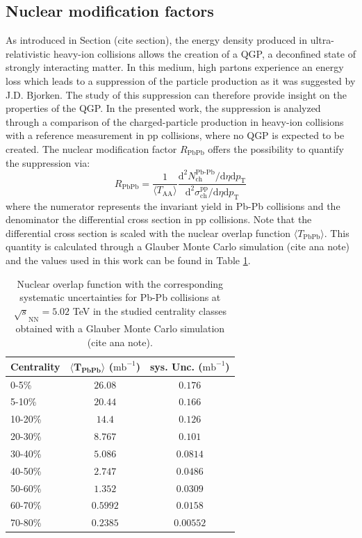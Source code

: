\documentclass[12pt,a4paper]{report}
\begin{document}
\subsection{Nuclear modification factors}
As introduced in Section (cite section), the energy density produced in ultra-relativistic heavy-ion collisions  allows the creation of a QGP, a deconfined state of strongly interacting matter. In this medium, high \pt partons experience an energy loss which leads to a suppression of the particle production as it was suggested by J.D. Bjorken. The study of this suppression can therefore provide insight on the properties of the QGP. In the presented work, the suppression is analyzed through a comparison of the charged-particle production in heavy-ion collisions with a reference measurement in pp collisions, where no QGP is expected to be created. The nuclear modification factor $R_\text{PbPb} $ offers the possibility to quantify the suppression via:
\begin{equation}
R_\text{PbPb} = \dfrac{1}{\langle T_\text{AA}\rangle} \dfrac{\text{d}^2 N^\text{Pb-Pb}_\text{ch} / \text{d}\eta \text{d}p_\text{T}}{\text{d}^2 \sigma^\text{pp}_\text{ch} / \text{d}\eta \text{d}p_\text{T}}
\end{equation}
where the numerator represents the invariant yield in Pb-Pb collisions and the denominator the differential cross section in pp collisions. Note that the differential cross section is scaled with the nuclear overlap function $\langle T_\text{PbPb} \rangle$. This quantity is calculated through a Glauber Monte Carlo simulation (cite ana note) and the values used in this work can be found in Table \ref{tab:taa}.\\
\begin{table}[tb!]
\renewcommand{\arraystretch}{1.5}
\centering
\begin{tabular}{l c c}
\toprule
\rowcolor{headerBlue}  \textbf{Centrality} &  \textbf{$\mathbf{\langle T_\text{PbPb} \rangle}$ ($\text{mb}^{-1}$)}  &   \textbf{sys. Unc. } ($\text{mb}^{-1}$) \\
\midrule
\midrule
0-5\% & $26.08$  & $0.176$\\
5-10\% & $20.44$ & $0.166$\\
10-20\% & $14.4$ & $0.126$ \\
20-30\% & $8.767$ & $0.101$ \\
30-40\% & $5.086$ & $0.0814$ \\
40-50\% & $2.747$ & $0.0486$\\
50-60\% & $1.352$ & $0.0309$\\
60-70\% & $0.5992$ & $0.0158$\\
70-80\% & $0.2385$ & $0.00552$ \\
\bottomrule
\end{tabular}
\caption{Nuclear overlap function with the corresponding systematic uncertainties for Pb-Pb collisions at $\sqrt{s}_\text{NN}=5.02$ TeV in the studied centrality classes obtained with a Glauber Monte Carlo simulation (cite ana note).}
\label{tab:taa}
\end{table}
\end{document}
